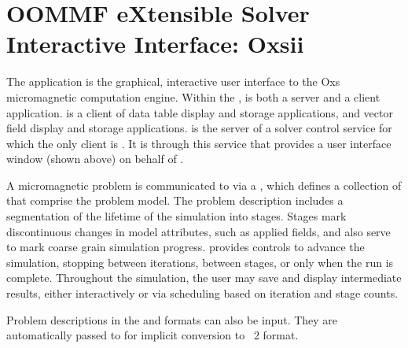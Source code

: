 \section{OOMMF eXtensible Solver Interactive Interface:
Oxsii}\label{sec:oxsii}%

\begin{center}
\end{center}

The application  is the graphical, interactive user interface
to the Oxs micromagnetic computation engine.  Within the
,  is both a server and a client
application.  is a client of data table display and storage
applications, and vector field display and storage applications.
 is the server of a solver control service for which the only
client is .  It is through
this service that  provides a user interface window (shown
above) on behalf of .

A micromagnetic problem is communicated to  via a
,
which defines a collection of 
that comprise the problem model.  The problem description includes a
segmentation of the lifetime of the simulation into stages.  Stages mark
discontinuous changes in model attributes, such as applied fields, and
also serve to mark coarse grain simulation progress.  
provides controls to advance the simulation, stopping between
iterations, between stages, or only when the run is complete.
Throughout the simulation, the user may save and display intermediate
results, either interactively or via scheduling based on iteration and
stage counts.

Problem descriptions in the  and
 formats can also be input.  They are
automatically passed to  for implicit conversion to \MIF~2 format.

